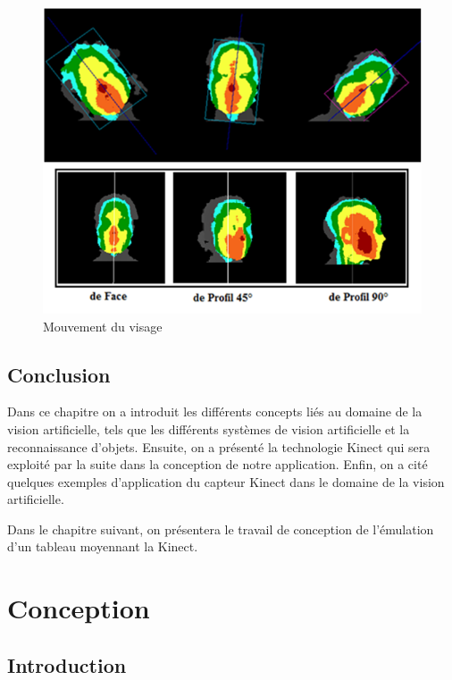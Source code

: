 \documentclass[12pt,a4paper,oneside]{book}
\begin{document}
	\begin{figure}[H]
		\centering
		\includegraphics[scale=0.6]{v1.png}
		\caption{ Mouvement du visage }
		\label{fig1f}
	\end{figure}
	
	
	
	\section{Conclusion}
	Dans ce chapitre on a introduit les différents concepts liés au domaine de la vision artificielle, tels que les différents systèmes de vision artificielle et la reconnaissance d'objets.
	Ensuite, on a présenté la technologie Kinect qui sera exploité par la suite dans la conception de notre application.
	Enfin, on a cité quelques exemples d'application du capteur Kinect dans le domaine de la vision artificielle.
	
	Dans le chapitre suivant, on présentera le travail de conception de l'émulation d'un tableau moyennant la Kinect.
	
	
	
	
	
	
	\chapter{Conception}
	
	\section{Introduction}
	
\end{document}
